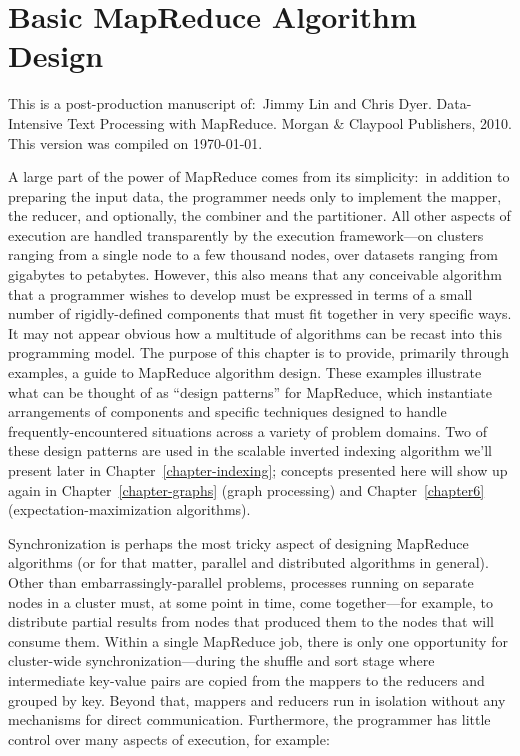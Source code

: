 \chapter{Basic MapReduce Algorithm Design}
\label{chapter3}

\thispagestyle{empty}

\begin{small}
\noindent This is a post-production manuscript of:\ Jimmy Lin and
Chris Dyer. Data-Intensive Text Processing with MapReduce. Morgan \&
Claypool Publishers, 2010. This version was compiled on \today.\\
\end{small}

\noindent A large part of the power of MapReduce comes from its simplicity:\ in
addition to preparing the input data, the programmer needs only to
implement the mapper, the reducer, and optionally, the combiner and
the partitioner.  All other aspects of execution are handled
transparently by the execution framework---on clusters ranging from a
single node to a few thousand nodes, over datasets ranging from
gigabytes to petabytes.  However, this also means that any conceivable
algorithm that a programmer wishes to develop must be expressed in
terms of a small number of rigidly-defined components that must fit
together in very specific ways.  It may not appear obvious how a
multitude of algorithms can be recast into this programming model.
The purpose of this chapter is to provide, primarily through examples,
a guide to MapReduce algorithm design.  These examples illustrate what
can be thought of as ``design patterns'' for MapReduce, which
instantiate arrangements of components and specific techniques
designed to handle frequently-encountered situations across a variety
of problem domains.  Two of these design patterns are used in the
scalable inverted indexing algorithm we'll present later in
Chapter~\ref{chapter-indexing}; concepts presented here will show up
again in Chapter~\ref{chapter-graphs} (graph processing) and
Chapter~\ref{chapter6} (expectation-maximization algorithms).

Synchronization is perhaps the most tricky aspect of designing
MapReduce algorithms (or for that matter, parallel and distributed
algorithms in general).  Other than embarrassingly-parallel problems,
processes running on separate nodes in a cluster must, at some point
in time, come together---for example, to distribute partial results
from nodes that produced them to the nodes that will consume them.
Within a single MapReduce job, there is only one opportunity for
cluster-wide synchronization---during the shuffle and sort stage where
intermediate key-value pairs are copied from the mappers to the
reducers and grouped by key.  Beyond that, mappers and reducers run in
isolation without any mechanisms for direct communication.
Furthermore, the programmer has little control over many aspects of
execution, for example:

